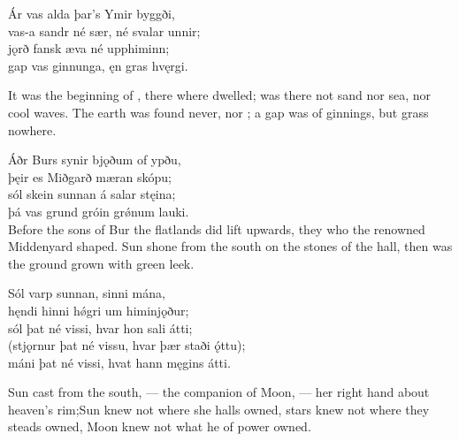 \bva Ár vas alda \hld þar’s Ymir byggði,\footnotemark[1] \\%
vas-a sandr né sær, \hld né svalar unnir; \\%
jǫrð fansk æva \hld né upphiminn; \\%
gap vas ginnunga, \hld ęn gras hvęrgi.\\%

\bvb It was the beginning of , there where  dwelled\footnotemark[1]; was there not sand nor sea, nor cool waves. The earth was found never, nor ; a gap was of ginnings\footnotemark[2], but grass nowhere.\\%

\bva Áðr Burs synir \hld bjǫðum of ypðu, \\%
þęir es Miðgarð \hld mæran skópu; \\%
sól skein sunnan \hld á salar stęina; \\%
þá vas grund gróin \hld grǿnum lauki.\\%

\bvb Before the sons of Bur the flatlands did lift upwards, they who the renowned Middenyard shaped. Sun shone from the south on the stones of the hall, then was the ground grown with green leek.\footnotemark[1]\\%

\bva Sól varp sunnan, \hld sinni mána,\footnotemark[1] \\%
hęndi hinni hǿgri \hld um himinjǫður; \\%
sól þat né vissi, \hld hvar hon sali átti; \\%
(stjǫrnur þat né vissu, \hld hvar þær staði ǫ́ttu); \\%
máni þat né vissi, \hld hvat hann męgins átti.\\%

\bvb Sun cast from the south, — the companion of Moon, — her right hand about heaven’s rim;\footnotemark[1] Sun knew not where she halls owned, stars knew not where they steads owned, Moon knew not what he of power owned.\\%

